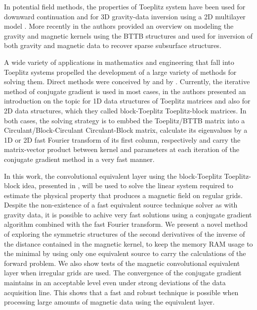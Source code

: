 In potential field methods, the properties of Toeplitz system have been used for downward continuation \citep{zhang-etal2016} and for 3D gravity-data inversion using a 2D multilayer model \citep{zhang-wong2015}. More recently in \cite{hogue2020tutorial} the authors provided an overview on modeling the gravity and magnetic kernels using the BTTB structures and \cite{renaut2020fast} used for inversion of both gravity and magnetic data to recover sparse subsurface structures.

A wide variety of applications in mathematics and engineering that fall into Toeplitz systems propelled the development of a large variety of  methods for solving them. Direct methods were conceived by \cite{levinson1946} and by \cite{trench1964}. Currently, the iterative method of conjugate gradient is used in most cases, in \cite{chan-jin2007} the authors presented an introduction on the topic for 1D data structures of Toeplitz matrices and also for 2D data structures, which they called block-Toeplitz Toeplitz-block matrices. In both cases, the solving strategy is to embbed the Toeplitz/BTTB matrix into a Circulant/Block-Circulant Circulant-Block matrix, calculate its eigenvalues by a 1D or 2D fast Fourier transform of its first column, respectively and carry the matrix-vector product between kernel and parameters at each iteration of the conjugate gradient method in a very fast manner.

In this work, the convolutional equivalent layer using the block-Toeplitz Toeplitz-block idea, presented in \cite{takahashi2020convolutional}, will be used to solve the linear system required to estimate the physical property that produces a magnetic field on regular grids. Despite the non-existence of a fast equivalent source technique solver as with gravity data, it is possible to achive very fast solutions using a conjugate gradient algorithm combined with the fast Fourier transform. We present a novel method of exploring the symmetric structures of the second derivatives of the inverse of the distance contained in the magnetic kernel, to keep the memory RAM usage to the minimal by using only one equivalent source to carry the calculations of the forward problem. We also show tests of the magnetic convolutional equivalent layer when irregular grids are used. The convergence of the conjugate gradient maintains in an acceptable level even under strong deviations of the data acquisition line. This shows that a fast and robust technique is possible when processing large amounts of magnetic data using the equivalent layer.